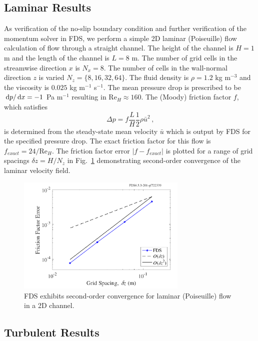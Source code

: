 \documentclass[11pt]{book}
\begin{document}
\subsection{Laminar Results}
\label{laminar}

As verification of the no-slip boundary condition and further verification of the momentum solver in FDS, we perform a simple 2D laminar (Poiseuille) flow calculation of
flow through a straight channel.
The height of the channel is $H=1$ m and the length of the channel is $L=8$ m.
The number of grid cells in the streamwise direction $x$ is $N_x = 8$.  The number of cells in the wall-normal direction $z$ is varied $N_z = \{8,16,32,64\}$.
The fluid density is $\rho = 1.2$ kg m$^{-3}$ and the viscosity is $0.025$ kg m$^{-1}$ s$^{-1}$.
The mean pressure drop is prescribed to be $\,\mathrm{d} p/ \,\mathrm{d} x = -1$ Pa m$^{-1}$ resulting in Re$_H \approx 160$.  The (Moody) friction factor $f$, which satisfies
\begin{equation}
\label{eqn_moodyf}
\Delta p = f \frac{L}{H} \frac{1}{2} \rho \bar{u}^2 \,\mbox{,}
\end{equation}
is determined from the steady-state mean velocity $\bar{u}$ which is output by FDS for the specified pressure drop.  The exact friction factor for this flow is $f_{exact} = 24/\mbox{Re}_H$.  The friction factor error $|f-f_{exact}|$ is plotted for a range of grid spacings $\delta z = H/N_z$ in Fig.~\ref{fig_poiseuille_convergence} demonstrating second-order convergence of the laminar velocity field.
\begin{figure}
\centering
\includegraphics[width=3.2in]{SCRIPT_FIGURES/poiseuille_convergence}
\caption[Convergence for laminar (Poiseuille) flow in a 2D channel]{FDS exhibits second-order convergence for laminar (Poiseuille) flow in a 2D channel.}
\label{fig_poiseuille_convergence}
\end{figure}

\subsection{Turbulent Results}
\label{turbulent}
\end{document}
